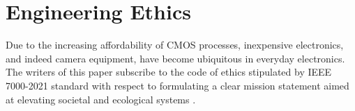 \documentclass[lettersize,journal]{IEEEtran}
\begin{document}
\section{Engineering Ethics}
	Due to the increasing affordability of CMOS processes, inexpensive electronics, and indeed camera equipment, have become ubiquitous in everyday electronics.
	The writers of this paper subscribe to the code of ethics stipulated by IEEE 7000-2021 standard with respect to formulating a clear mission statement aimed at elevating societal and ecological systems \cite{ieee7001}.
\printbibliography
\end{document}
